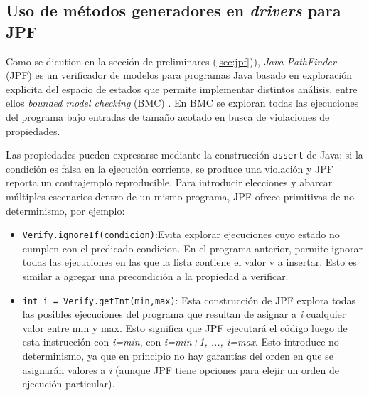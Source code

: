 

\subsection{Uso de métodos generadores en \emph{drivers} para JPF}

Como se dicution en la sección de preliminares (\ref{sec:jpf})), \emph{Java PathFinder} (JPF) es un verificador de modelos para programas Java
basado en exploración explícita del espacio de estados que permite implementar
distintos análisis, entre ellos \emph{bounded model checking} (BMC) \cite{Visser04,Pasareanu10}.
En BMC se exploran todas las ejecuciones del programa bajo entradas de tamaño
acotado en busca de violaciones de propiedades. 

Las propiedades pueden expresarse mediante la construcción \texttt{assert} de Java; si la condición es
falsa en la ejecución corriente, se produce una violación y JPF reporta un
contrajemplo reproducible. Para introducir elecciones y abarcar múltiples
escenarios dentro de un mismo programa, JPF ofrece primitivas de
no–determinismo, por ejemplo:

\begin{itemize}
\item \texttt{Verify.ignoreIf(condicion)}:Evita explorar ejecuciones cuyo estado no
cumplen con el predicado condicion. En el programa anterior, permite ignorar todas las ejecuciones en las que la lista contiene el valor v a insertar.
Esto es similar a agregar una precondición a la propiedad a verificar.
\item \texttt{int i = Verify.getInt(min,max)}: Esta construcción de JPF explora todas las posibles ejecuciones del programa que resultan de asignar 
a \emph{i} cualquier valor entre min y max. Esto significa que JPF ejecutará el código luego
de esta instrucción con \emph{i=min}, con \emph{i=min+1, ..., i=max}. Esto introduce no
determinismo, ya que en principio no hay garantías del orden en que se
asignarán valores a \emph{i} (aunque JPF tiene opciones para elejir un orden de
ejecución particular). 
\end{itemize}


